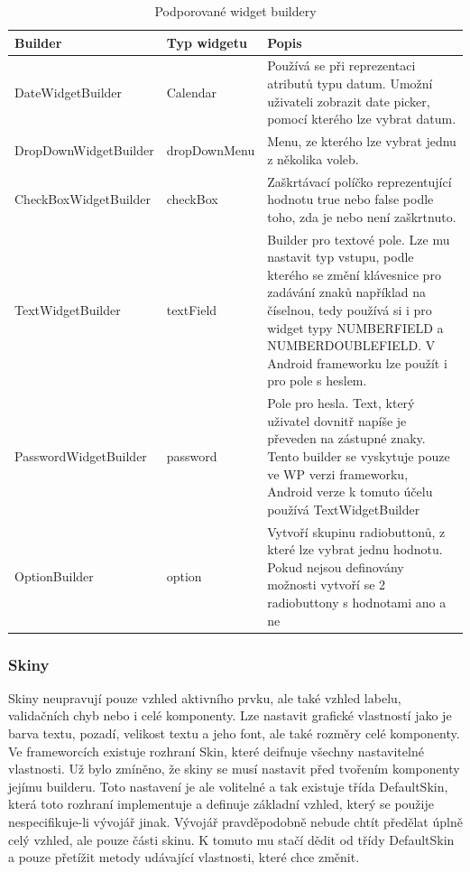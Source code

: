 \begin{table}[h!]
\begin{center}
\caption{Podporované widget buildery}
\label{table:widgetBuilders}
\begin{tabular}{|p{4cm}|p{3cm}|p{7cm}|}
\hline
\textbf{Builder} & \textbf{Typ widgetu} & \textbf{Popis} \\
\hline
DateWidgetBuilder & 
Calendar & Používá se při reprezentaci atributů typu datum. Umožní uživateli zobrazit date picker, pomocí kterého lze vybrat datum. \\
\hline
DropDownWidgetBuilder &
dropDownMenu & Menu, ze kterého lze vybrat jednu z několika voleb. \\
\hline
CheckBoxWidgetBuilder & checkBox &
Zaškrtávací políčko reprezentující hodnotu true nebo false podle toho, zda je nebo není zaškrtnuto. \\
\hline
TextWidgetBuilder & textField &
Builder pro textové pole. Lze mu nastavit typ vstupu, podle kterého se změní klávesnice pro zadávání znaků například na číselnou, tedy používá si i pro widget typy NUMBERFIELD a NUMBERDOUBLEFIELD. V Android frameworku lze použít i pro pole s heslem. \\
\hline
PasswordWidgetBuilder & password &
Pole pro hesla. Text, který uživatel dovnitř napíše je převeden na zástupné znaky. Tento builder se vyskytuje pouze ve WP verzi frameworku, Android verze k tomuto účelu používá TextWidgetBuilder \\
\hline
OptionBuilder & option &
Vytvoří skupinu radiobuttonů, z které lze vybrat jednu hodnotu. Pokud nejsou definovány možnosti vytvoří se 2 radiobuttony s hodnotami ano a ne \\
\hline
\end{tabular}
\end{center}
\end{table}

\subsubsection{Skiny}
Skiny neupravují pouze vzhled aktivního prvku, ale také vzhled labelu, validačních chyb nebo i celé komponenty. Lze nastavit grafické vlastností jako je barva textu, pozadí, velikost textu a jeho font, ale také rozměry celé komponenty. Ve frameworcích existuje rozhraní Skin, které deifnuje všechny nastavitelné vlastnosti. Už bylo zmíněno, že skiny se musí nastavit před tvořením komponenty jejímu builderu. Toto nastavení je ale volitelné a tak existuje třída DefaultSkin, která toto rozhraní implementuje a definuje základní vzhled, který se použije nespecifikuje-li vývojář jinak. Vývojář pravděpodobně nebude chtít předělat úplně celý vzhled, ale pouze části skinu. K tomuto mu stačí dědit od třídy DefaultSkin a pouze přetížit metody udávající vlastnosti, které chce změnit. 

